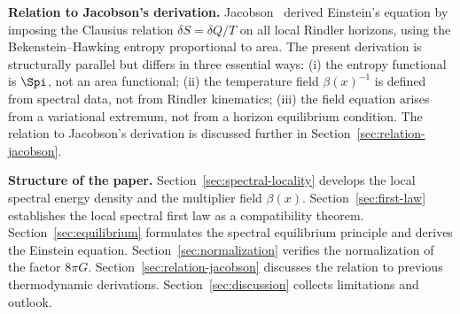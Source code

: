   \medskip
  \noindent\textbf{Relation to Jacobson's derivation.}
  Jacobson~\cite{Jacobson1995} derived Einstein's equation by imposing the Clausius
  relation $\delta S = \delta Q/T$ on all local Rindler horizons, using the
  Bekenstein--Hawking entropy proportional to area.
  The present derivation is structurally parallel but differs in three essential ways:
  (i) the entropy functional is $\Spi$, not an area functional;
  (ii) the temperature field $\beta(x)^{-1}$ is defined from spectral data, not from
  Rindler kinematics;
  (iii) the field equation arises from a variational extremum, not from a horizon
  equilibrium condition.
  The relation to Jacobson's derivation is discussed further in
  Section~\ref{sec:relation-jacobson}.

  \medskip
  \noindent\textbf{Structure of the paper.}
  Section~\ref{sec:spectral-locality} develops the local spectral energy density and
  the multiplier field $\beta(x)$.
  Section~\ref{sec:first-law} establishes the local spectral first law as a
  compatibility theorem.
  Section~\ref{sec:equilibrium} formulates the spectral equilibrium principle and
  derives the Einstein equation.
  Section~\ref{sec:normalization} verifies the normalization of the factor $8\pi G$.
  Section~\ref{sec:relation-jacobson} discusses the relation to previous thermodynamic
  derivations.
  Section~\ref{sec:discussion} collects limitations and outlook.
